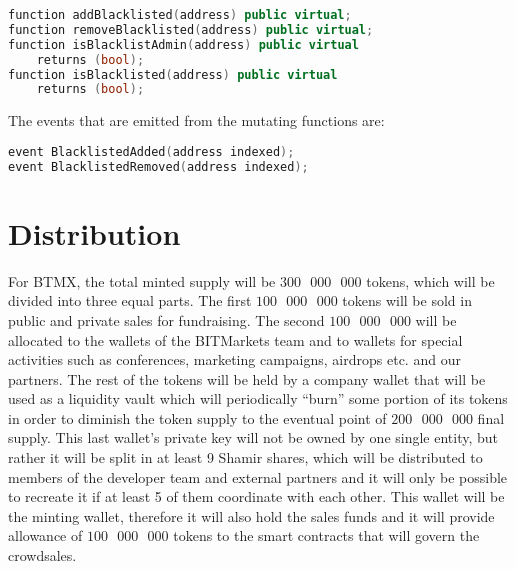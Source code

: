 \documentclass[a4paper,12pt]{article}
\begin{document}
\begin{lstlisting}[language=C++, caption=Solidity blacklist functions.]
function addBlacklisted(address) public virtual;
function removeBlacklisted(address) public virtual;
function isBlacklistAdmin(address) public virtual
    returns (bool);
function isBlacklisted(address) public virtual
    returns (bool);
\end{lstlisting}
The events that are emitted from the mutating functions are:

\begin{lstlisting}[language=C++, caption=Solidity blacklist events.]
event BlacklistedAdded(address indexed);
event BlacklistedRemoved(address indexed);
\end{lstlisting}

\section{Distribution
}
For BTMX, the total minted supply will be $300\text{ }000\text{ }000$ tokens,
which will be divided into three equal parts.
The first $100\text{ }000\text{ }000$ tokens will be sold in public and private sales for fundraising.
The second $100\text{ }000\text{ }000$ will be allocated to the wallets of the
BITMarkets team and to wallets for special activities such as
conferences, marketing campaigns, airdrops etc. and our partners.
The rest of the tokens will be held by a company wallet
that will be used as a liquidity vault which will periodically ``burn'' some portion of its tokens in order to diminish the token supply to the eventual point of $200\text{ }000\text{ }000$ final supply.
This last wallet's private key will not be owned by one single entity, but rather it will
be split in at least 9 Shamir shares, which will be distributed to members of the developer team and
external partners and it will only be possible to recreate it if at least 5 of them coordinate with each other.
This wallet will be the minting wallet, therefore it will also hold the sales funds and it will provide allowance of
$100\text{ }000\text{ }000$ tokens to the smart contracts that will govern the crowdsales.

\begin{center}
\end{center}
\end{document}
